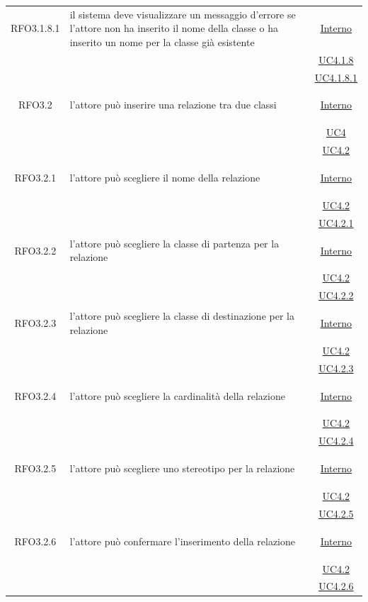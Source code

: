 \begin{itemize}
\begin{itemize}
\begin{itemize}
\begin{itemize}
\begin{longtable}{|c|>{\centering}m{7cm}|c|}
\hypertarget{RFO3.1.8.1}{RFO3.1.8.1} & il sistema deve visualizzare un messaggio d'errore se l'attore non ha inserito il nome della classe o ha inserito un nome per la classe già esistente &  \hyperlink{Interno}{Interno}\\
& &\hyperref[UC4.1.8]{UC4.1.8}\\
& &\hyperref[UC4.1.8.1]{UC4.1.8.1}\\ \hline

\hypertarget{RFO3.2}{RFO3.2} & l'attore può inserire una relazione tra due classi & \hyperlink{Interno}{Interno}\\
& &\hyperref[UC4]{UC4}\\
& &\hyperref[UC4.2]{UC4.2}\\ \hline

\hypertarget{RFO3.2.1}{RFO3.2.1} & l'attore può scegliere il nome della relazione & \hyperlink{Interno}{Interno}\\
& &\hyperref[UC4.2]{UC4.2}\\
& &\hyperref[UC4.2.1]{UC4.2.1}\\ \hline

\hypertarget{RFO3.2.2}{RFO3.2.2} & l'attore può scegliere la classe di partenza per la relazione & \hyperlink{Interno}{Interno}\\
& &\hyperref[UC4.2]{UC4.2}\\
& &\hyperref[UC4.2.2]{UC4.2.2}\\ \hline

\hypertarget{RFO3.2.3}{RFO3.2.3} & l'attore può scegliere la classe di destinazione per la relazione & \hyperlink{Interno}{Interno}\\
& &\hyperref[UC4.2]{UC4.2}\\
& &\hyperref[UC4.2.3]{UC4.2.3}\\ \hline

\hypertarget{RFO3.2.4}{RFO3.2.4} & l'attore può scegliere la cardinalità della relazione & \hyperlink{Interno}{Interno}\\
& &\hyperref[UC4.2]{UC4.2}\\
& &\hyperref[UC4.2.4]{UC4.2.4}\\ \hline

\hypertarget{RFO3.2.5}{RFO3.2.5} & l'attore può scegliere uno stereotipo per la relazione & \hyperlink{Interno}{Interno}\\
& &\hyperref[UC4.2]{UC4.2}\\
& &\hyperref[UC4.2.5]{UC4.2.5}\\ \hline

\hypertarget{RFO3.2.6}{RFO3.2.6} & l'attore può confermare l'inserimento della relazione & \hyperlink{Interno}{Interno}\\
& &\hyperref[UC4.2]{UC4.2}\\
& &\hyperref[UC4.2.6]{UC4.2.6}\\ \hline


\end{longtable}
\end{itemize}
\end{itemize}
\end{itemize}
\end{itemize}

